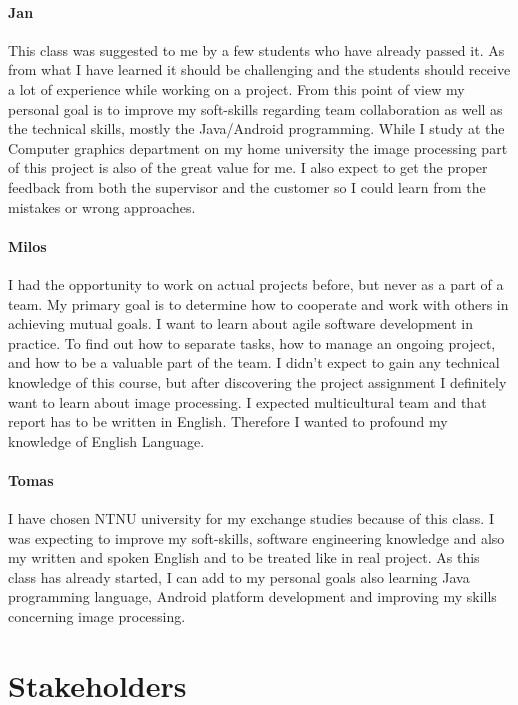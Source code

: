\paragraph{Jan}

This class was suggested to me by a few students who have already passed it. As from what I have learned it should be challenging and the students should receive a lot of experience while working on a project. From this point of view my personal goal is to improve my soft-skills regarding team collaboration as well as the technical skills, mostly the Java/Android programming. While I study at the Computer graphics department on my home university the image processing part of this project is also of the great value for me. I also expect to get the proper feedback from both the supervisor and the customer so I could learn from the mistakes or wrong approaches.

\paragraph{Milos}

I had the opportunity to work on actual projects before, but never as a part of a team. 
My primary goal is to determine how to cooperate and work with others in achieving mutual goals.
I want to learn about agile software development in practice.
To find out how to separate tasks, how to manage an ongoing project, and how to be a valuable part of the team.
I didn't expect to gain any technical knowledge of this course, but after discovering the project assignment I definitely want to learn about image processing.
I expected multicultural team and that report has to be written in English.
Therefore I wanted to profound my knowledge of English Language.

\paragraph{Tomas}
I have chosen NTNU university for my exchange studies because of this class. 
I was expecting to improve my soft-skills, software engineering knowledge and also my written and spoken English and to be treated like in real project.
As this class has already started, I can add to my personal goals also learning Java programming language,
Android platform development and improving my skills concerning image processing.

\section{Stakeholders}

